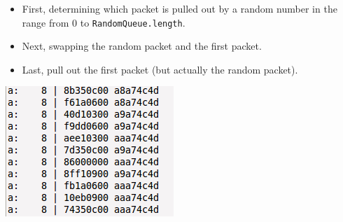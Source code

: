 \documentclass[a4paper]{article}
\begin{document}
  \begin{itemize}
  	\item First, determining which packet is pulled out by a random number in the range from $0$ to \texttt{RandomQueue.length}.
  	\item Next, swapping the random packet and the first packet.
  	\item Last, pull out the first packet (but actually the random packet).
  \end{itemize}
  \begin{center}
	\includegraphics[scale=0.70]{test-randomqueue.png}
	\label{fig:test-randomqueue}
  \end{center}
\end{document}
